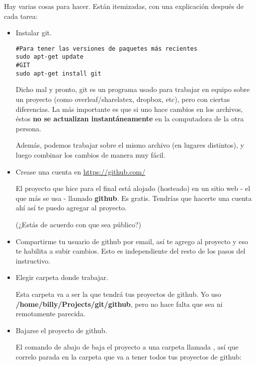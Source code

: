 \documentclass[10pt,a4paper]{report}
\begin{document}
Hay varias cosas para hacer. Están itemizadas, con una explicación después de cada tarea:


\begin{itemize}

	\item Instalar git. 
\begin{lstlisting}
#Para tener las versiones de paquetes más recientes
sudo apt-get update
#GIT
sudo apt-get install git
\end{lstlisting}

Dicho mal y pronto, git es un programa usado para trabajar en equipo sobre un proyecto (como overleaf/sharelatex, dropbox, etc), pero con ciertas diferencias. La más importante es que si uno hace cambios en los archivos, éstos \textbf{no se actualizan instantáneamente} en la computadora de la otra persona.

Además, podemos trabajar sobre el mismo archivo (en lugares distintos), y luego combinar los cambios de manera muy fácil.

\item Crease una cuenta en \url{https://github.com/}

El proyecto que hice para el final está alojado (hosteado) en un sitio web - el que más se usa - llamado \textbf{github}. Es gratis. Tendrías que hacerte una cuenta ahí así te puedo agregar al proyecto.

(¿Estás de acuerdo con que sea público?)

\item Compartirme tu usuario de github por email, así te agrego al proyecto y eso te habilita a subir cambios. Esto es independiente del resto de los pasos del instructivo.

\item Elegir carpeta donde trabajar.

Esta carpeta va a ser la que tendrá tus proyectos de github. Yo uso \textbf{/home/billy/Projects/git/github}, pero no hace falta que sea ni remotamente parecida.

\item Bajarse el proyecto de github.

El comando de abajo de baja el proyecto a una carpeta llamada , así que correlo parada en la carpeta que va a tener todos tus proyectos de github:


\end{itemize}
\end{document}

